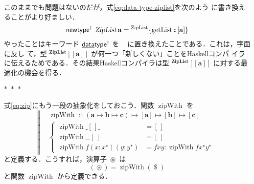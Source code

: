 \documentclass[a5paper,twoside,fleqn,draft]{jsbook}
\def\[{[\![}
\def\]{]\!]}
\newcommand{\separator}{\begin{center}$*$~$*$~$*$\end{center}}
\newcommand{\programminglanguage}[1]{\textsf{#1}}
\newcommand{\haskell}{\programminglanguage{Haskell}}
\newcommand{\mBrace}{\Vert}
\newcommand{\mKeyword}[1]{\mathsf{#1}}
\newcommand{\mKeywordUnderline}[1]{\text{\underline{\textsf{#1}}}}
\newcommand{\mDataTypeKeyword}{\mKeywordUnderline{data}\mKeyword{type}}
\newcommand{\mNewTypeDeclKeyword}{\mKeyword{newtype}}
\DeclareMathOperator{\mDataTypePolymorphic}{\mDataTypeKeyword^\dagger}
\DeclareMathOperator{\mNewTypeDeclPolymorphic}{\mNewTypeDeclKeyword^\dagger}
\newcommand{\mEmptyList}{{[\,]}}
\newcommand{\mSpecialFunc}[1]{#1}
\DeclareMathOperator{\mGetList}{\mSpecialFunc{getList}}
\DeclareMathOperator{\mZipWith}{\mSpecialFunc{zipWith}}
\DeclareMathOperator{\mApply}{\$}
\DeclareMathOperator{\mIn}{{:\!:}}
\DeclareMathOperator{\mMapsTo}{\mapsto}
\DeclareMathOperator{\mZip}{\circledast}
\newcommand{\mType}[1]{\mathbf{#1}} %
\newcommand{\mA}{\mType{a}}
\newcommand{\mB}{\mType{b}}
\newcommand{\mC}{\mType{c}}
\newcommand{\mTypeAssemble}[2]{{}^{\mType{#1}}\[\mType{#2}\]}
\newcommand{\mZipListType}[1]{\mTypeAssemble{ZipList}{#1}}
\newcommand{\mTypeConstructor}[1]{\textsl{#1}}
\DeclareMathOperator{\mZipListTypeConstructor}{\mTypeConstructor{ZipList}}
\newcommand{\mValueConstructor}[1]{\mathrm{#1}}
\newcommand{\mValueRecordWith}[2]{{}^\mValueConstructor{#1}\{#2\}}
\newcommand{\mZipListRecordWith}[1]{\mValueRecordWith{ZipList}{#1}}
\newcommand{\mList}[1]{{#1}^\mathrm{\star}}
\newcommand{\mProjEXP}[2]{#1\mMapsTo#2} %
\begin{document}
このままでも問題はないのだが，式\eqref{eq:data-type-ziplist}を次のよう
に書き換えることがより好ましい．
\begin{equation}
  \mNewTypeDeclPolymorphic\;
  \mZipListTypeConstructor\mA
  =\mZipListRecordWith{\mGetList\mIn{}[\mA]}
\end{equation}
やったことはキーワード $\mDataTypePolymorphic$ を
$\mNewTypeDeclPolymorphic$ に置き換えたことである．これは，字面に反し
て，型 $\mZipListType{a}$ が何一つ「新しくない」ことを\haskell コンパ
イラに伝えるためである．その結果\haskell コンパイラは型
$\mZipListType{a}$ に対する最適化の機会を得る．

\separator

式\eqref{eq:zip}にもう一段の抽象化をしておこう．関数 $\mZipWith$ を
\begin{equation}
  \left\mBrace
  \begin{aligned}
    {}&\mZipWith\mIn{}\mProjEXP{\mProjEXP{\mProjEXP{(\mProjEXP{\mA }
          {\mProjEXP{\mB }{\mC }})}
        {[\mA]}}{[\mB]}}{[\mC]}\\
    {}&\left\{\begin{aligned}
    \mZipWith\_\mEmptyList\_
    &=\mEmptyList\\
    \mZipWith\_\_\mEmptyList
    &=\mEmptyList\\
    \mZipWith f(x:\mList{x})(y:\mList{y})
    &=fxy:\mZipWith f\mList{x}\mList{y}
    \end{aligned}
    \right.
  \end{aligned}
  \right.
\end{equation}
と定義する．こうすれば，演算子 $\mZip$ は
\begin{equation}
  (\mZip)
  =\mZipWith(\mApply)
\end{equation}
と関数 $\mZipWith$ から定義できる．
\end{document}
